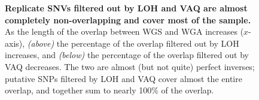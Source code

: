 \documentclass[11 pt]{article} %
\begin{document}
\begin{figure}
\caption{ \textbf{Replicate SNVs filtered out by LOH and VAQ are almost completely non-overlapping and cover most of the sample.} As the length of the overlap between WGS and WGA increases ($x$-axis),  \textit{(above)} the percentage of the overlap filtered out by LOH increases, and \textit{(below)} the percentage of the overlap filtered out by VAQ decreases. The two are almost (but not quite) perfect inverses; putative SNPs filtered by LOH and VAQ cover almost the entire overlap, and together sum to nearly 100\% of the overlap.}
\label{fig:LOH-VAQ_all}
\end{figure}
\end{document}
